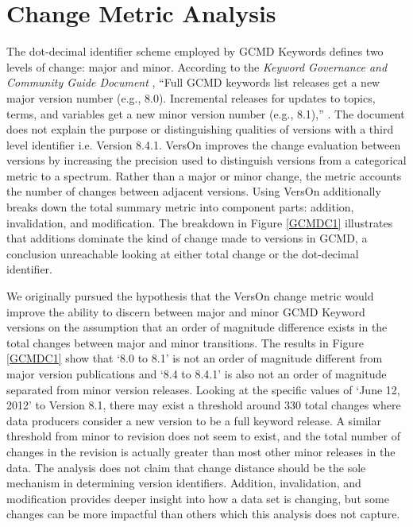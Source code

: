 \section{Change Metric Analysis}

The dot-decimal identifier scheme employed by GCMD Keywords defines two levels of change: major and minor.
According to the \textit{Keyword Governance and Community Guide Document} \cite{gcmd_gov}, ``Full GCMD keywords list releases get a new major version number (e.g., 8.0). Incremental releases for updates to topics, terms, and variables get a new minor version number (e.g., 8.1),” \cite{gcmd_gov}.
The document does not explain the purpose or distinguishing qualities of versions with a third level identifier i.e. Version 8.4.1.
VersOn improves the change evaluation between versions by increasing the precision used to distinguish versions from a categorical metric to a spectrum.
Rather than a major or minor change, the metric accounts the number of changes between adjacent versions.
Using VersOn additionally breaks down the total summary metric into component parts: addition, invalidation, and modification.
The breakdown in Figure \ref{GCMDC1} illustrates that additions dominate the kind of change made to versions in GCMD, a conclusion unreachable looking at either total change or the dot-decimal identifier.

We originally pursued the hypothesis that the VersOn change metric would improve the ability to discern between major and minor GCMD Keyword versions on the assumption that an order of magnitude difference exists in the total changes between major and minor transitions.
The results in Figure \ref{GCMDC1} show that `8.0 to 8.1' is not an order of magnitude different from major version publications and `8.4 to 8.4.1' is also not an order of magnitude separated from minor version releases.
Looking at the specific values of `June 12, 2012' to Version 8.1, there may exist a threshold around 330 total changes where data producers consider a new version to be a full keyword release.
A similar threshold from minor to revision does not seem to exist, and the total number of changes in the revision is actually greater than most other minor releases in the data. 
The analysis does not claim that change distance should be the sole mechanism in determining version identifiers.
Addition, invalidation, and modification provides deeper insight into how a data set is changing, but some changes can be more impactful than others which this analysis does not capture.

